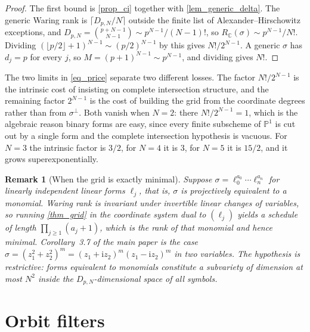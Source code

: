 \documentclass[final]{siamltex}
\newtheorem{remark}[remark]{Remark}
\newcommand{\C}{\mathbb{C}}
\begin{document}
\begin{proof}
  The first bound is \cref{prop_ci} together with \cref{lem_generic_delta}.
  The generic Waring rank is $\lceil D_{p,N}/N \rceil$ outside the finite list of
  Alexander--Hirschowitz exceptions, and
  $D_{p,N} = \binom{p+N-1}{N-1} \sim p^{N-1}/(N-1)!$, so
  $R_{\C}(\sigma) \sim p^{N-1}/N!$.  Dividing
  $(\lfloor p/2\rfloor+1)^{N-1} \sim (p/2)^{N-1}$ by this gives
  $N!/2^{N-1}$.  A generic $\sigma$ has $d_{j}=p$ for every $j$, so
  $M = (p+1)^{N-1} \sim p^{N-1}$, and dividing gives $N!$.
\end{proof}

The two limits in \eqref{eq_price} separate two different losses.  The factor
$N!/2^{N-1}$ is the intrinsic cost of insisting on complete intersection
structure, and the remaining factor $2^{N-1}$ is the cost of building the grid
from the coordinate degrees rather than from $\sigma^{\perp}$.  Both vanish when
$N = 2$: there $N!/2^{N-1} = 1$, which is the algebraic reason binary forms are
easy, since every finite subscheme of $\mathbb{P}^{1}$ is cut out by a single
form and the complete intersection hypothesis is vacuous.  For $N=3$ the
intrinsic factor is $3/2$, for $N=4$ it is $3$, for $N=5$ it is $15/2$, and it
grows superexponentially.

\begin{remark}[When the grid is exactly minimal]\label{rmk_tight}
  Suppose $\sigma = \ell_{0}^{a_{0}}\cdots\ell_{n}^{a_{n}}$ for linearly
  independent linear forms $\ell_{j}$, that is, $\sigma$ is projectively
  equivalent to a monomial.  Waring rank is invariant under invertible linear
  changes of variables, so running \cref{thm_grid} in the coordinate system dual
  to $(\ell_{j})$ yields a schedule of length $\prod_{j\ge1}(a_{j}+1)$, which is
  the rank of that monomial and hence minimal.  Corollary~3.7 of the main paper
  is the case $\sigma = (z_{1}^{2}+z_{2}^{2})^{m} = (z_{1}+\mathrm{i}z_{2})^{m}(z_{1}-\mathrm{i}z_{2})^{m}$
  in two variables.  The hypothesis is restrictive: forms equivalent to
  monomials constitute a subvariety of dimension at most $N^{2}$ inside the
  $D_{p,N}$-dimensional space of all symbols.
\end{remark}

\section{Orbit filters}\label{sec_orbit}
\end{document}
